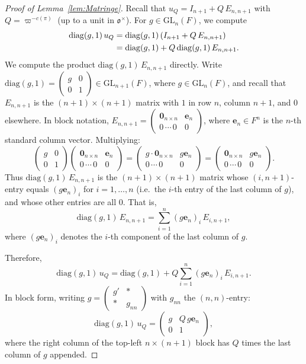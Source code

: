 \documentclass[12pt]{article}
\begin{document}
\begin{proof}[Proof of Lemma~\ref{lem:Matringe}]
Recall that $u_Q = I_{n+1} + Q\,E_{n,n+1}$ with $Q = \varpi^{-c(\pi)}$ (up to a
unit in $\mathfrak{o}^\times$).  For $g \in \mathrm{GL}_n(F)$, we compute
\begin{align}\label{eq:diag-uQ}
  \mathrm{diag}(g,1)\,u_Q
  &= \mathrm{diag}(g,1)\,(I_{n+1} + Q\,E_{n,n+1}) \notag\\
  &= \mathrm{diag}(g,1) + Q\,\mathrm{diag}(g,1)\,E_{n,n+1}.
\end{align}
We compute the product $\mathrm{diag}(g,1)\,E_{n,n+1}$ directly.  Write
$\mathrm{diag}(g,1) = \begin{pmatrix} g & 0 \\ 0 & 1 \end{pmatrix} \in
\mathrm{GL}_{n+1}(F)$, where $g \in \mathrm{GL}_n(F)$, and recall that
$E_{n,n+1}$ is the $(n+1)\times(n+1)$ matrix with $1$ in row $n$, column $n+1$,
and $0$ elsewhere.  In block notation, $E_{n,n+1} = \begin{pmatrix}
\mathbf{0}_{n\times n} & \mathbf{e}_n \\ 0\,\cdots\, 0 & 0 \end{pmatrix}$,
where $\mathbf{e}_n \in F^n$ is the $n$-th standard column vector.  Multiplying:
\[
  \begin{pmatrix} g & 0 \\ 0 & 1 \end{pmatrix}
  \begin{pmatrix} \mathbf{0}_{n\times n} & \mathbf{e}_n \\ 0\,\cdots\,0 & 0 \end{pmatrix}
  = \begin{pmatrix} g\cdot\mathbf{0}_{n\times n} & g\mathbf{e}_n \\ 0\,\cdots\,0 & 0 \end{pmatrix}
  = \begin{pmatrix} \mathbf{0}_{n\times n} & g\mathbf{e}_n \\ 0\,\cdots\,0 & 0 \end{pmatrix}.
\]
Thus $\mathrm{diag}(g,1)\,E_{n,n+1}$ is the $(n+1)\times(n+1)$ matrix whose
$(i,n+1)$-entry equals $(g\mathbf{e}_n)_i$ for $i=1,\ldots,n$ (i.e.\ the $i$-th
entry of the last column of $g$), and whose other entries are all $0$.  That is,
\[
  \mathrm{diag}(g,1)\,E_{n,n+1}
  = \sum_{i=1}^{n} (g\mathbf{e}_n)_i\, E_{i,n+1},
\]
where $(g\mathbf{e}_n)_i$ denotes the $i$-th component of the last column of $g$.

Therefore,
\begin{equation}\label{eq:diag-uQ-explicit}
  \mathrm{diag}(g,1)\,u_Q
  = \mathrm{diag}(g,1) + Q\sum_{i=1}^{n} (g\mathbf{e}_n)_i\, E_{i,n+1}.
\end{equation}
In block form, writing $g = \begin{pmatrix} g' & * \\ * & g_{nn} \end{pmatrix}$
with $g_{nn}$ the $(n,n)$-entry:
\[
  \mathrm{diag}(g,1)\,u_Q
  = \begin{pmatrix} g & Q\,g\mathbf{e}_n \\ 0 & 1 \end{pmatrix},
\]
where the right column of the top-left $n\times(n+1)$ block has $Q$ times the last
column of $g$ appended.


\end{proof}
\end{document}
